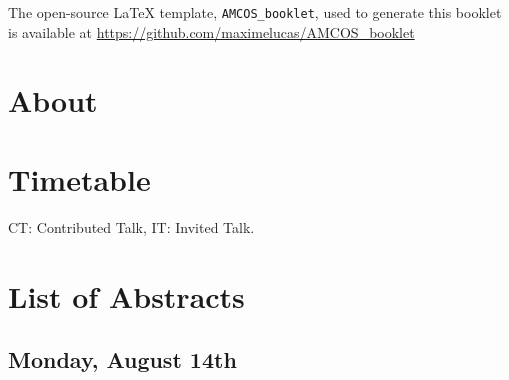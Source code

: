 \documentclass[openany, parskip=full, 12pt, a4]{scrbook}
\begin{document}
	
	
\mbox{}
\thispagestyle{empty}
\vfill
\begin{center}
The open-source \LaTeX{} template, \verb"AMCOS_booklet", used to generate this booklet is available at \url{https://github.com/maximelucas/AMCOS\_booklet}
\end{center}

\newpage

\tableofcontents

\chapter{About}



\chapter{Timetable}

CT: Contributed Talk, IT: Invited Talk.



\chapter{List of Abstracts}

\section{Monday, August 14th}








\end{document}
